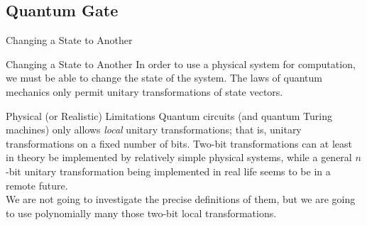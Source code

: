 \documentclass{beamer}
\renewcommand{\:}{\text{ }}
\begin{document}
    \subsection{Quantum Gate}
    \begin{frame}{Changing a State to Another}
        \begin{block}{Changing a State to Another}
            In order to use a physical system for computation, we must be able to change the state of the system.
            The laws of quantum mechanics \alert{only permit unitary} transformations of state vectors.
        \end{block}
        \begin{alertblock}{Physical (or Realistic) Limitations}
            \small
            Quantum circuits (and quantum Turing machines) only allows \textit{local} unitary transformations;
            that is, unitary transformations on \alert{a fixed number of bits}.
            Two-bit transformations can at least in theory be implemented by relatively simple physical systems,
            while a general $n$-bit unitary transformation being implemented in real life seems to be in a remote future.\\
            We are not going to investigate the precise definitions of them, but we are going to use \alert{polynomially many} those two-bit local transformations.
        \end{alertblock}
    \end{frame}
\end{document}
